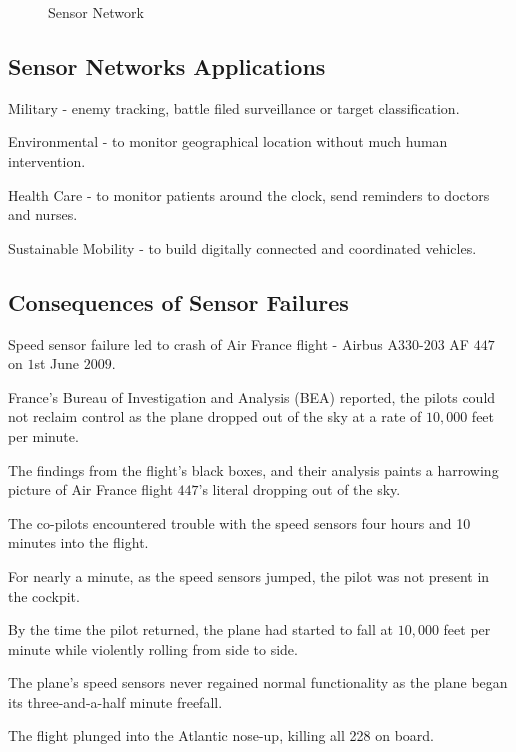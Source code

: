 \documentclass[%
  slidesonly,%
  semlayer%
  ]{seminar}                                  %
\begin{document}
\begin{slide}
    \begin{figure}[h!]
      \centering
      \caption{Sensor Network}
      \label{fig:sensor-network}
    \end{figure}

    \clearpage

  \subsection*{Sensor Networks Applications}
    Military - enemy tracking, battle filed surveillance or target classification.

    Environmental - to monitor geographical location without much human intervention.
    
    Health Care - to monitor patients around the clock, send reminders to doctors and nurses.
  
    Sustainable Mobility - to build digitally connected and coordinated vehicles.

    \clearpage

  \subsection*{Consequences of Sensor Failures}
      Speed sensor failure led to crash of Air France flight - Airbus A$330$-$203$ AF $447$ on $1$st June $2009$.
      
      France's Bureau of Investigation and Analysis (BEA) reported, the pilots could not reclaim control as the plane dropped out of the sky at a rate of $10,000$ feet per minute.

      The findings from the flight's black boxes, and their analysis paints a harrowing picture of Air France flight $447$'s literal dropping out of the sky.

      The co-pilots encountered trouble with the speed sensors four hours and 10 minutes into the flight.

      For nearly a minute, as the speed sensors jumped, the pilot was not present in the cockpit. 
      
      By the time the pilot returned, the plane had started to fall at $10,000$ feet per minute while violently rolling from side to side.
      
      The plane's speed sensors never regained normal functionality as the plane began its three-and-a-half minute freefall.
      
      The flight plunged into the Atlantic nose-up, killing all 228 on board.
      

\end{slide}
\end{document}
